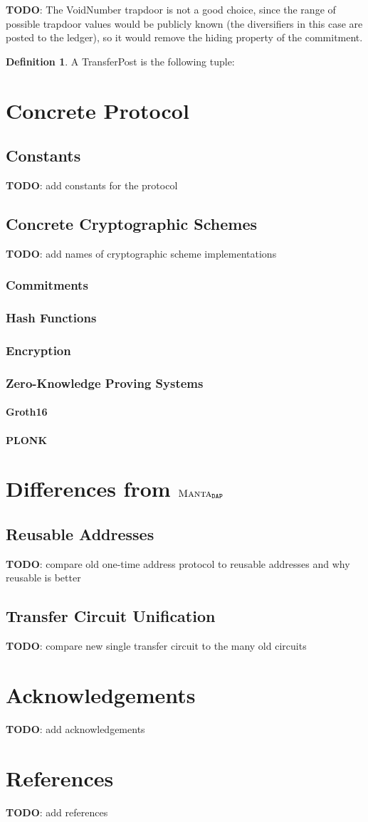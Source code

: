 \documentclass[a4paper]{article}
\newcommand{\subsubsubsection}[1]{\paragraph{#1}}
\newcommand{\lsection}[2]{\def\sectionlabel{#2} \section{#1}\label{sec:#2}}
\newcommand{\TODO}[1]{{\color{red}\textbf{TODO}}: #1}
\theoremstyle{definition}
\newtheorem{definition}{Definition}[subsection]
\newcommand{\MantaDAP}{{\Manta{}_{\texttt{DAP}}}}
\newcommand{\Manta}{{\textsc{Manta}}}
\newcommand{\TransferPost}{{\textsf{TransferPost}}}
\newcommand{\Transfer}{{\textsf{Transfer}}}
\newcommand{\VoidNumber}{{\textsf{VoidNumber}}}
\begin{document}
\TODO{The \VoidNumber{} trapdoor is not a good choice, since the range of possible trapdoor values would be publicly known (the diversifiers in this case are posted to the ledger), so it would remove the hiding property of the commitment.}

\begin{definition}
    A \TransferPost{} is the following tuple:
\end{definition}

\lsection{Concrete Protocol}{concrete-protocol}

\subsection{Constants}

\TODO{add constants for the protocol}

\subsection{Concrete Cryptographic Schemes}

\TODO{add names of cryptographic scheme implementations}

\subsubsection{Commitments}

\subsubsection{Hash Functions}

\subsubsection{Encryption}

\subsubsection{Zero-Knowledge Proving Systems}

\subsubsubsection{Groth16}

\subsubsubsection{PLONK}

\lsection{Differences from $\MantaDAP$}{differences}

\subsection{Reusable Addresses}

\TODO{compare old one-time address protocol to reusable addresses and why reusable is better}

\subsection{\Transfer{} Circuit Unification}

\TODO{compare new single transfer circuit to the many old circuits}

\lsection{Acknowledgements}{acknowledgements}

\TODO{add acknowledgements}

\lsection{References}{references}

\TODO{add references}
\end{document}
